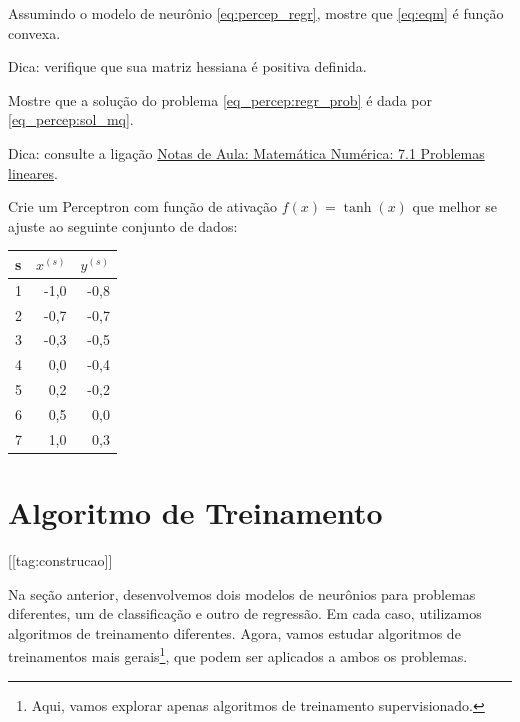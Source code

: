 \begin{exer}\label{exer:eqm_convexa}
  Assumindo o modelo de neurônio \eqref{eq:percep_regr}, mostre que \eqref{eq:eqm} é função convexa.
\end{exer}
\begin{resp}
  Dica: verifique que sua matriz hessiana é positiva definida.
\end{resp}

\begin{exer}\label{exer_percep:sol_mq}
  Mostre que a solução do problema \eqref{eq_percep:regr_prob} é dada por \eqref{eq_percep:sol_mq}.
\end{exer}
\begin{resp}
  Dica: consulte a ligação \href{https://notaspedrok.com.br/notas/MatematicaNumerica/cap_ajuste_sec_prob_lin.html}{Notas de Aula: Matemática Numérica: 7.1 Problemas lineares}.
\end{resp}

\begin{exer}
  Crie um Perceptron com função de ativação $f(x)=\tanh(x)$ que melhor se ajuste ao seguinte conjunto de dados:
  \begin{center}
  \begin{tabular}{l|rr}
    s & $x^{(s)}$ & $y^{(s)}$\\\hline
    1 & -1,0 & -0,8 \\
    2 & -0,7 & -0,7 \\
    3 & -0,3 & -0,5 \\
    4 &  0,0 & -0,4 \\
    5 &  0,2 & -0,2 \\
    6 &  0,5 &  0,0 \\
    7 &  1,0 &  0,3 \\\hline
  \end{tabular}
\end{center}
\end{exer}

\section{Algoritmo de Treinamento}\label{cap_percepton_sec_train}
[[tag:construcao]]

Na seção anterior, desenvolvemos dois modelos de neurônios para problemas diferentes, um de classificação e outro de regressão. Em cada caso, utilizamos algoritmos de treinamento diferentes. Agora, vamos estudar algoritmos de treinamentos mais gerais\footnote{Aqui, vamos explorar apenas algoritmos de treinamento supervisionado.}, que podem ser aplicados a ambos os problemas.

